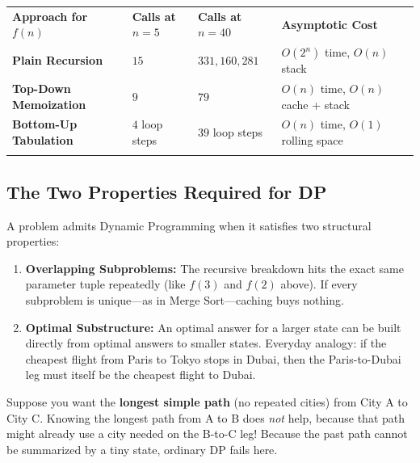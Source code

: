 \documentclass[11pt,a4paper]{article}
\theoremstyle{definition}
\begin{document}
\begingroup\small{}
\begin{tabularx}{\textwidth}{>{\raggedright\arraybackslash\bfseries}p{4.3cm} >{\centering\arraybackslash}p{2.5cm} >{\centering\arraybackslash}p{2.5cm} >{\raggedright\arraybackslash}X}
\arrayrulecolor{primaryblue}\toprule[1.2pt]
\rowcolor{primaryblue!10}
\textcolor{primaryblue}{\textbf{Approach for $f(n)$}} & \textcolor{primaryblue}{\textbf{Calls at $n = 5$}} & \textcolor{primaryblue}{\textbf{Calls at $n = 40$}} & \textcolor{primaryblue}{\textbf{Asymptotic Cost}} \\
\arrayrulecolor{codeframe}\midrule[0.6pt]
Plain Recursion & $15$ & $331{,}160{,}281$ & $O(2^n)$ time, $O(n)$ stack \\
Top-Down Memoization & $9$ & $79$ & $O(n)$ time, $O(n)$ cache + stack \\
Bottom-Up Tabulation & $4$ loop steps & $39$ loop steps & $O(n)$ time, $O(1)$ rolling space \\
\arrayrulecolor{primaryblue}\bottomrule[1.2pt]
\end{tabularx}\endgroup

\subsection{The Two Properties Required for DP}

A problem admits Dynamic Programming when it satisfies two structural properties:

\begin{enumerate}
    \item \textbf{Overlapping Subproblems:} The recursive breakdown hits the exact same parameter tuple repeatedly (like $f(3)$ and $f(2)$ above). If every subproblem is unique---as in Merge Sort---caching buys nothing.
    \item \textbf{Optimal Substructure:} An optimal answer for a larger state can be built directly from optimal answers to smaller states. Everyday analogy: if the cheapest flight from Paris to Tokyo stops in Dubai, then the Paris-to-Dubai leg must itself be the cheapest flight to Dubai.
\end{enumerate}

\begin{watchoutbox}
Suppose you want the \textbf{longest simple path} (no repeated cities) from City A to City C. Knowing the longest path from A to B does \emph{not} help, because that path might already use a city needed on the B-to-C leg! Because the past path cannot be summarized by a tiny state, ordinary DP fails here.
\end{watchoutbox}
\end{document}
